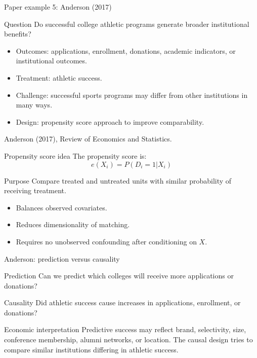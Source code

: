\documentclass[aspectratio=169,11pt]{beamer}
\newcommand{\econ}[1]{\begin{exampleblock}{Economic interpretation}#1\end{exampleblock}}
\newcommand{\smallcite}[1]{{\scriptsize \textcolor{WLUGray}{#1}}}
\begin{document}
\begin{frame}{Paper example 5: Anderson (2017)}
\begin{block}{Question}
Do successful college athletic programs generate broader institutional benefits?
\end{block}
\begin{itemize}
  \item Outcomes: applications, enrollment, donations, academic indicators, or institutional outcomes.
  \item Treatment: athletic success.
  \item Challenge: successful sports programs may differ from other institutions in many ways.
  \item Design: propensity score approach to improve comparability.
\end{itemize}
\smallcite{Anderson (2017), Review of Economics and Statistics.}
\end{frame}

\begin{frame}{Propensity score idea}
The propensity score is:
\[
e(X_i)=P(D_i=1|X_i)
\]
\begin{block}{Purpose}
Compare treated and untreated units with similar probability of receiving treatment.
\end{block}
\begin{itemize}
  \item Balances observed covariates.
  \item Reduces dimensionality of matching.
  \item Requires no unobserved confounding after conditioning on $X$.
\end{itemize}
\end{frame}

\begin{frame}{Anderson: prediction versus causality}
\begin{block}{Prediction}
Can we predict which colleges will receive more applications or donations?
\end{block}
\begin{alertblock}{Causality}
Did athletic success cause increases in applications, enrollment, or donations?
\end{alertblock}
\econ{
Predictive success may reflect brand, selectivity, size, conference membership, alumni networks, or location. The causal design tries to compare similar institutions differing in athletic success.
}
\end{frame}
\end{document}
